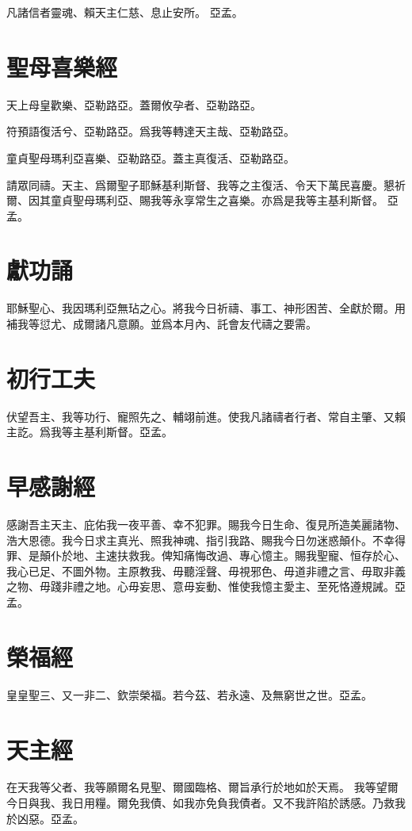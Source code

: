 \versicle 凡諸信者靈魂、賴天主仁慈、息止安所。 \response 亞孟。

\section*{聖母喜樂經}
\versicle 天上母皇歡樂、亞勒路亞。\response 蓋爾攸孕者、亞勒路亞。

\versicle 符預語復活兮、亞勒路亞。\response 爲我等轉達天主哉、亞勒路亞。

\versicle 童貞聖母瑪利亞喜樂、亞勒路亞。\response 蓋主真復活、亞勒路亞。

\versicle 請眾同禱。{\cspace}天主、爲爾聖子耶穌基利斯督、我等之主復活、令天下萬民喜慶。懇祈爾、因其童貞聖母瑪利亞、賜我等永享常生之喜樂。亦爲是我等主基利斯督。 \response 亞孟。

\section*{獻功誦}
耶穌聖心、我因瑪利亞無玷之心。將我今日祈禱、事工、神形困苦、全獻於爾。用補我等愆尤、成爾諸凡意願。並爲本月內、託會友代禱之要需。

\section*{初行工夫}
伏望吾主、我等功行、寵照先之、輔翊前進。使我凡諸禱者行者、常自主肇、又賴主訖。爲我等主基利斯督。{\cspace}亞孟。

\section*{早感謝經}
感謝吾主天主、庇佑我一夜平善、幸不犯罪。賜我今日生命、復見所造美麗諸物、浩大恩德。我今日求主真光、照我神魂、指引我路、賜我今日勿迷惑顛仆。不幸得罪、是顛仆於地、主速扶救我。俾知痛悔改過、專心憶主。賜我聖寵、恒存於心、我心已足、不圖外物。主原教我、毋聽淫聲、毋視邪色、毋道非禮之言、毋取非義之物、毋踐非禮之地。心毋妄思、意毋妄動、惟使我憶主愛主、至死恪遵規誡。{\cspace}亞孟。

\section*{榮福經}
皇皇聖三、又一非二、欽崇榮福。若今茲、若永遠、及無窮世之世。{\cspace}亞孟。


\section*{天主經}
在天我等父者、我等願爾名見聖、爾國臨格、爾旨承行於地如於天焉。 我等望爾今日與我、我日用糧。爾免我債、如我亦免負我債者。又不我許陷於誘感。乃救我於凶惡。{\cspace}亞孟。

